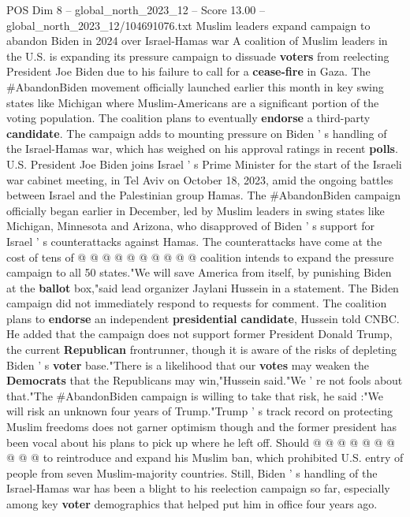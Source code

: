 \begin{textsample}{POS Dim 8 – global\_north\_2023\_12 – Score 13.00 – global\_north\_2023\_12/104691076.txt}  \label{ex:f8_pos_112}
Muslim leaders expand campaign to abandon Biden in 2024 over Israel-Hamas war A coalition of Muslim leaders in the U.S. is expanding its pressure campaign to dissuade \textbf{voters} from reelecting President Joe Biden due to his failure to call for a \textbf{cease-fire} in Gaza.
The \#AbandonBiden movement officially launched earlier this month in key swing states like Michigan where Muslim-Americans are a significant portion of the voting population.
The coalition plans to eventually \textbf{endorse} a third-party \textbf{candidate}.
The campaign adds to mounting pressure on Biden ' s handling of the Israel-Hamas war, which has weighed on his approval ratings in recent \textbf{polls}.
U.S.
President Joe Biden joins Israel ' s Prime Minister for the start of the Israeli war cabinet meeting, in Tel Aviv on October 18, 2023, amid the ongoing battles between Israel and the Palestinian group Hamas.
The \#AbandonBiden campaign officially began earlier in December, led by Muslim leaders in swing states like Michigan, Minnesota and Arizona, who disapproved of Biden ' s support for Israel ' s counterattacks against Hamas.
The counterattacks have come at the cost of tens of @ @ @ @ @ @ @ @ @ @ coalition intends to expand the pressure campaign to all 50 states."We will save America from itself, by punishing Biden at the \textbf{ballot} box,"said lead organizer Jaylani Hussein in a statement.
The Biden campaign did not immediately respond to requests for comment.
The coalition plans to \textbf{endorse} an independent \textbf{presidential} \textbf{candidate}, Hussein told CNBC.
He added that the campaign does not support former President Donald Trump, the current \textbf{Republican} frontrunner, though it is aware of the risks of depleting Biden ' s \textbf{voter} base."There is a likelihood that our \textbf{votes} may weaken the \textbf{Democrats} that the Republicans may win,"Hussein said."We ' re not fools about that."The \#AbandonBiden campaign is willing to take that risk, he said :"We will risk an unknown four years of Trump."Trump ' s track record on protecting Muslim freedoms does not garner optimism though and the former president has been vocal about his plans to pick up where he left off.
Should @ @ @ @ @ @ @ @ @ @ to reintroduce and expand his Muslim ban, which prohibited U.S. entry of people from seven Muslim-majority countries.
Still, Biden ' s handling of the Israel-Hamas war has been a blight to his reelection campaign so far, especially among key \textbf{voter} demographics that helped put him in office four years ago.

\end{textsample}
